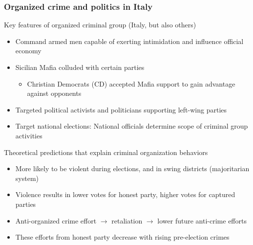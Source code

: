 \documentclass[aspectratio=169]{beamer}
\begin{document}
\begin{frame}
\frametitle{Organized crime and politics in Italy} 
Key features of organized criminal group (Italy, but also others)
\begin{itemize}\setlength\itemsep{3pt}
\item Command armed men capable of exerting intimidation and influence official economy
\item Sicilian Mafia colluded with certain parties
\begin{itemize}
\item Christian Democrats (CD) accepted Mafia support to gain advantage against opponents
\end{itemize}
\item Targeted political activists and politicians supporting left-wing parties
\item Target national elections: National officials determine scope of criminal group activities
\end{itemize}\medskip
Theoretical predictions that explain criminal organization behaviors
\begin{itemize}\setlength\itemsep{3pt}
\item More likely to be violent during elections, and in swing districts (majoritarian system)
\item Violence results in lower votes for honest party, higher votes for captured parties
\item Anti-organized crime effort $\to$ retaliation $\to$ lower future anti-crime efforts
\item These efforts from honest party decrease with rising pre-election crimes
\end{itemize}

\end{frame}
\end{document}
